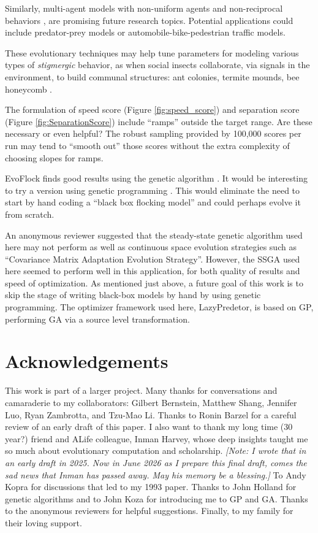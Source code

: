 \documentclass[letterpaper]{article}
\begin{document}
Similarly, multi-agent models with non-uniform agents \citep{montanari_optimal_2025} and non-reciprocal behaviors \citep{choi_flocking_2025}, \citep{weis_generalized_2025} are promising future research topics. Potential applications could include predator-prey models or automobile-bike-pedestrian traffic models.

These evolutionary techniques may help tune parameters for modeling various types of \textit{stigmergic} behavior, as when social insects collaborate, via signals in the environment, to build communal structures: ant colonies, termite mounds, bee honeycomb \citep{camazine_self-organization_2003}.

The formulation of speed score (Figure \ref{fig:speed_score}) and separation score (Figure \ref{fig:SeparationScore}) include ``ramps'' outside the target range. Are these necessary or even helpful? The robust sampling provided by 100,000 scores per run may tend to ``smooth out'' those scores without the extra complexity of choosing slopes for ramps.

EvoFlock finds good results using the genetic algorithm \citep{holland_adaptation_1975}. It would be interesting to try a version using genetic programming \citep{koza_genetic_1992}. This would eliminate the need to start by hand coding a ``black box flocking model'' and could perhaps evolve it from scratch.

An anonymous reviewer suggested that the steady-state genetic algorithm used here may not perform as well as continuous space evolution strategies \citep{hansen_coco_2021} such as ``Covariance Matrix Adaptation Evolution Strategy''. However, the SSGA used here seemed to perform well in this application, for both quality of results and speed of optimization. As mentioned just above, a future goal of this work is to skip the stage of writing black-box models by hand by using genetic programming. The optimizer framework used here, LazyPredetor, is based on GP, performing GA via a source level transformation.

\section{Acknowledgements}
\label{sec:ack}

This work is part of a larger project. Many thanks for conversations and camaraderie to my collaborators: Gilbert Bernstein, Matthew Shang, Jennifer Luo, Ryan Zambrotta, and Tzu-Mao Li. Thanks to Ronin Barzel for a careful review of an early draft of this paper. I also want to thank my long time (30 year?) friend and ALife colleague, Inman Harvey, whose deep insights taught me so much about evolutionary computation and scholarship. \textit{[Note: I wrote that in an early draft in 2025. Now in June 2026 as I prepare this final draft, comes the sad news that Inman has passed away. May his memory be a blessing.]} To Andy Kopra for discussions that led to my 1993 paper. Thanks to John Holland for genetic algorithms and to John Koza for introducing me to GP and GA. Thanks to the anonymous reviewers for helpful suggestions. Finally, to my family for their loving support.



\end{document}
